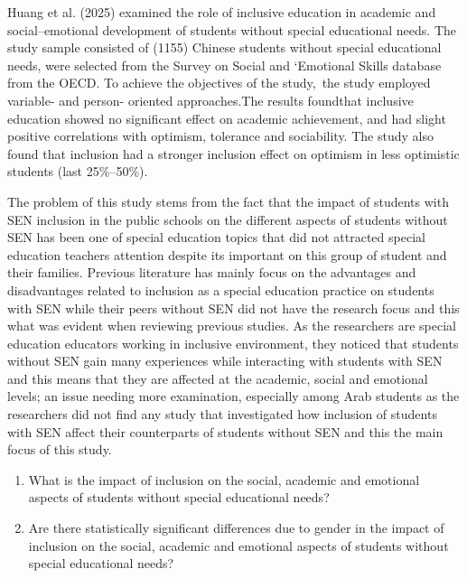 \documentclass[10pt]{NSP1}
\begin{document}
Huang et al. (2025) examined the role of inclusive education in academic and social--emotional development of students without special educational needs. The study sample consisted of (1155) Chinese students without special educational needs, were selected from the Survey on Social and `Emotional Skills database from the OECD. To achieve the objectives of the study,~the study employed variable- and person- oriented approaches.The results foundthat inclusive education showed no significant effect on academic achievement, and had slight positive correlations with optimism, tolerance and sociability. The study also found that inclusion had a stronger inclusion effect on optimism in less optimistic students (last 25\%--50\%).

\par\medskip{}\smallskip

The problem of this study stems from the fact that the impact of students with SEN inclusion in the public schools on the different aspects of students without SEN has been one of special education topics that did not attracted special education teachers attention despite its important on this group of student and their families. Previous literature has mainly focus on the advantages and disadvantages related to inclusion as a special education practice on students with SEN while their peers without SEN did not have the research focus and this what was evident when reviewing previous studies. As the researchers are special education educators working in inclusive environment, they noticed that students without SEN gain many experiences while interacting with students with SEN and this means that they are affected at the academic, social and emotional levels; an issue needing more examination, especially among Arab students as the researchers did not find any study that investigated how inclusion of students with SEN affect their counterparts of students without SEN and this the main focus of this study.

\par\medskip{}\smallskip

\begin{enumerate}
  \item What is the impact of inclusion on the social, academic and emotional aspects of students without special educational needs?
  \item Are there statistically significant differences due to gender in the impact of inclusion on the social, academic and emotional aspects of students without special educational needs?
\end{enumerate}
\end{document}
